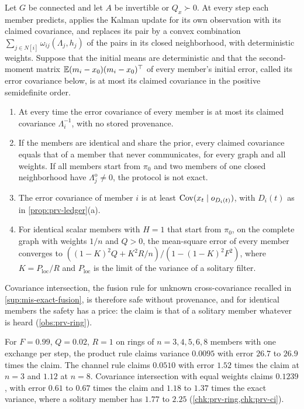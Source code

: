 \begin{proposition}\label{prop:prv-ci}
Let $G$ be connected and let $A$ be invertible or $Q_x\succ0$. At every step each member predicts, applies the Kalman update for its own observation with its claimed covariance, and replaces its pair by a convex combination $\sum_{j\in N[i]}\omega_{ij}(\Lambda_j,h_j)$ of the pairs in its closed neighborhood, with deterministic weights. Suppose that the initial means are deterministic and that the second-moment matrix $\mathbb{E}(m_i-x_0)(m_i-x_0)^\top$ of every member's initial error, called its error covariance below, is at most its claimed covariance in the positive semidefinite order.
\begin{enumerate}
\item[(a)] At every time the error covariance of every member is at most its claimed covariance $\Lambda_i^{-1}$, with no stored provenance.
\item[(b)] If the members are identical and share the prior, every claimed covariance equals that of a member that never communicates, for every graph and all weights. If all members start from $\pi_0$ and two members of one closed neighborhood have $\Lambda^{\mathrm o}_j\ne0$, the protocol is not exact.
\item[(c)] The error covariance of member $i$ is at least $\operatorname{Cov}(x_t\mid o_{D_i(t)})$, with $D_i(t)$ as in \cref{prop:prv-ledger}(a).
\item[(d)] For identical scalar members with $H=1$ that start from $\pi_0$, on the complete graph with weights $1/n$ and $Q>0$, the mean-square error of every member converges to $((1-K)^2Q+K^2R/n)/(1-(1-K)^2F^2)$, where $K=P_{\mathrm{loc}}/R$ and $P_{\mathrm{loc}}$ is the limit of the variance of a solitary filter.
\end{enumerate}
\end{proposition}

Covariance intersection, the fusion rule for unknown cross-covariance recalled in \cref{sup:mis-exact-fusion}, is therefore safe without provenance, and for identical members the safety has a price: the claim is that of a solitary member whatever is heard (\cref{obs:prv-ring}).

\begin{observation}\label{obs:prv-ring}
For $F=0.99$, $Q=0.02$, $R=1$ on rings of $n=3,4,5,6,8$ members with one exchange per step, the product rule claims variance $0.0095$ with error $26.7$ to $26.9$ times the claim. The channel rule claims $0.0510$ with error $1.52$ times the claim at $n=3$ and $1.12$ at $n=8$. Covariance intersection with equal weights claims $0.1239$, with error $0.61$ to $0.67$ times the claim and $1.18$ to $1.37$ times the exact variance, where a solitary member has $1.77$ to $2.25$ (\cref{chk:prv-ring,chk:prv-ci}).
\end{observation}

